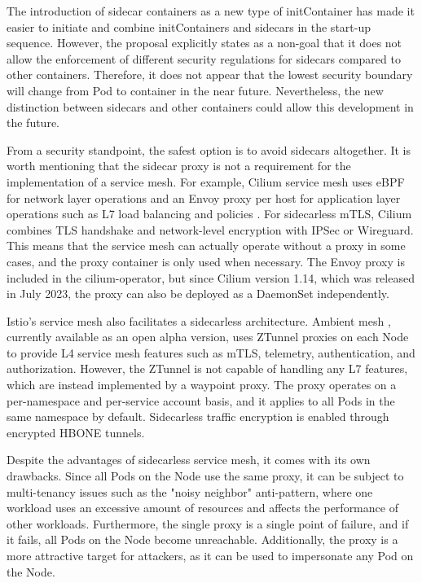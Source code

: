 \documentclass[english, 12pt, a4paper, sci, utf8, a-2b, online]{aaltothesis}
\begin{document}
The introduction of sidecar containers as a new type of initContainer has made it easier to initiate and combine initContainers and sidecars in the start-up sequence.
However, the proposal explicitly states as a non-goal that it does not allow the enforcement of different security regulations for sidecars compared to other containers.
Therefore, it does not appear that the lowest security boundary will change from Pod to container in the near future.
Nevertheless, the new distinction between sidecars and other containers could allow this development in the future.

From a security standpoint, the safest option is to avoid sidecars altogether.
It is worth mentioning that the sidecar proxy is not a requirement for the implementation of a service mesh.
For example, Cilium service mesh uses eBPF for network layer operations and an Envoy proxy per host for application layer operations such as L7 load balancing and policies \cite{cilium-114}.
For sidecarless mTLS, Cilium combines TLS handshake and network-level encryption with IPSec or Wireguard.
This means that the service mesh can actually operate without a proxy in some cases, and the proxy container is only used when necessary.
The Envoy proxy is included in the cilium-operator, but since Cilium version 1.14, which was released in July 2023, the proxy can also be deployed as a DaemonSet independently.

Istio's service mesh also facilitates a sidecarless architecture.
Ambient mesh \cite{istio-ambient-mesh}, currently available as an open alpha version, uses ZTunnel proxies on each Node to provide L4 service mesh features such as mTLS, telemetry, authentication, and authorization.
However, the ZTunnel is not capable of handling any L7 features, which are instead implemented by a waypoint proxy.
The proxy operates on a per-namespace and per-service account basis, and it applies to all Pods in the same namespace by default.
Sidecarless traffic encryption is enabled through encrypted HBONE tunnels.

Despite the advantages of sidecarless service mesh, it comes with its own drawbacks.
Since all Pods on the Node use the same proxy, it can be subject to multi-tenancy issues such as the "noisy neighbor" anti-pattern, where one workload uses an excessive amount of resources and affects the performance of other workloads.
Furthermore, the single proxy is a single point of failure, and if it fails, all Pods on the Node become unreachable.
Additionally, the proxy is a more attractive target for attackers, as it can be used to impersonate any Pod on the Node.
\end{document}
